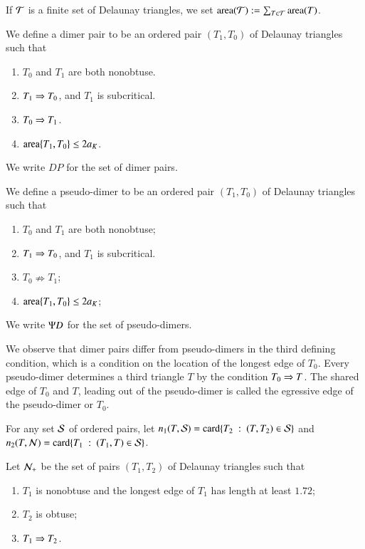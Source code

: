 
If $\T$ is a finite set of Delaunay triangles, we set $\area(\T):=\sum_{T\in\T} \area(T)$.

\begin{definition}
We define a dimer pair to be an ordered pair $(T_1,T_0)$ of Delaunay triangles
such that 
\begin{enumerate}
\item $T_0$ and $T_1$ are both nonobtuse.
\item $T_1\Ra T_0$, and $T_1$ is subcritical.
\item $T_0 \Ra T_1$.
\item $\area\{T_1,T_0\} \le 2\aK$.
\end{enumerate}
We write $DP$ for the set of dimer pairs.
\end{definition}

\begin{definition}
We define a pseudo-dimer to be an ordered pair $(T_1,T_0)$ of Delaunay triangles
such that
\begin{enumerate}
\item $T_0$ and $T_1$ are both nonobtuse;
\item $T_1\Ra T_0$, and  $T_1$ is subcritical.
\item $T_0 \nRightarrow T_1$;
\item $\area\{T_1,T_0\} \le 2\aK$;
\end{enumerate}
We write $\PD$ for the set of pseudo-dimers.
\end{definition}

We observe that dimer pairs differ from pseudo-dimers in the third defining condition, which is a condition
on the location of the longest edge of $T_0$.   Every pseudo-dimer determines a third triangle $T$ by
the condition $T_0\Ra T$.  The shared edge of $T_0$ and $T$, leading out of the pseudo-dimer
is called the egressive edge of the pseudo-dimer or $T_0$.


For any  set $\S$ of ordered pairs, let  $n_1(T,\S) 
= \card \{T_2\mid (T,T_2)\in \S\}$ and $n_2(T,\N) = \card \{T_1\mid
(T_1,T)\in \S\}$. 

Let $\N_+$ be the set of pairs $(T_1,T_2)$ of Delaunay triangles such that
\begin{enumerate}
\item $T_1$ is nonobtuse and the longest edge of $T_1$ has length at least $1.72$;
\item $T_2$ is obtuse;
\item $T_1\Ra T_2$.
\end{enumerate}

